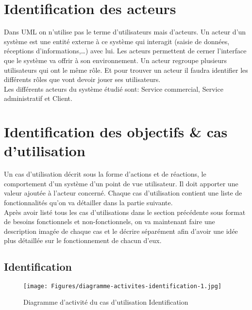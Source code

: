 \vspace{1cm}
\section{Identification des acteurs}
\vspace{.5cm}

Dans UML on n’utilise pas le terme d’utilisateurs mais d’acteurs. Un acteur d’un système est une entité externe à ce système qui interagit (saisie de données, réceptions d’informations,…) avec lui. Les acteurs permettent de cerner l’interface que le système va offrir à son environnement. Un acteur regroupe plusieurs utilisateurs qui ont le même rôle. Et pour trouver un acteur il faudra identifier les différents rôles que vont devoir jouer ses utilisateurs.
\vspace{.3cm}\\
Les différents acteurs du système étudié sont: Service commercial, Service administratif et Client.

\vspace{1cm}
\section{Identification des objectifs \& cas d'utilisation}
\vspace{.5cm}

Un cas d’utilisation décrit sous la forme d’actions et de réactions, le comportement d’un système d’un point de vue utilisateur. Il doit apporter une valeur ajoutée à l’acteur concerné. Chaque cas d’utilisation contient une liste de fonctionnalités qu’on va détailler dans la partie suivante.
\vspace{.3cm}\\
Après avoir listé tous les cas d’utilisations dans le section précédente sous format de besoins fonctionnels et non-fonctionnels, on va maintenant faire une description imagée de chaque cas et le décrire séparément afin d’avoir une idée plus détaillée sur le fonctionnement de chacun d’eux.

\vspace{.5cm}
\subsection{Identification}
\vspace{.5cm}

\begin{figure}[H]
    \centering
    \texttt{[image: Figures/diagramme-activites-identification-1.jpg]}
    \caption{Diagramme d'activité du cas d'utilisation Identification}
\end{figure}

